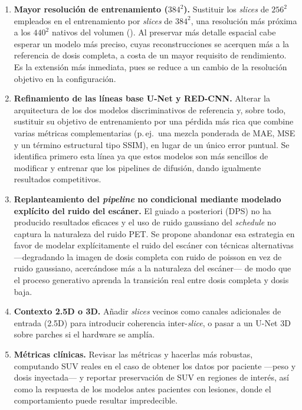 \begin{enumerate}[leftmargin=*]
    \item \textbf{Mayor resolución de entrenamiento ($384^2$).}
    Sustituir los \textit{slices} de $256^2$ empleados en el
    entrenamiento por \textit{slices} de $384^2$, una resolución
    más próxima a los $440^2$ nativos del volumen
    (). Al preservar más detalle
    espacial cabe esperar un modelo más preciso, cuyas
    reconstrucciones se acerquen más a la referencia de dosis
    completa, a costa de un mayor requisito de rendimiento. 
    Es la extensión más inmediata, pues se reduce a un cambio de 
    la resolución objetivo en la configuración.

    \item \textbf{Refinamiento de las líneas base U-Net y RED-CNN.}
    Alterar la arquitectura de los dos modelos discriminativos de
    referencia y, sobre todo, sustituir su objetivo de
    entrenamiento por una pérdida más rica que combine varias
    métricas complementarias (p.\,ej.\ una mezcla ponderada de MAE,
    MSE y un término estructural tipo SSIM), en lugar de un único
    error puntual. Se identifica primero esta línea ya que estos
    modelos son más sencillos de modificar y entrenar que los pipelines de 
    difusión, dando igualmente resultados competitivos.

    \item \textbf{Replanteamiento del \textit{pipeline} no
    condicional mediante modelado explícito del ruido del
    escáner.} El guiado a posteriori (DPS) no ha producido
    resultados eficaces y el uso de ruido gaussiano del
    \textit{schedule} no captura la naturaleza del ruido PET. Se
    propone abandonar esa estrategia en favor de modelar
    explícitamente el ruido del escáner con técnicas alternativas
    ---degradando la imagen de dosis completa con ruido de poisson en vez de
    ruido gaussiano, acercándose más a la naturaleza del escáner--- de modo que el
    proceso generativo aprenda la transición real entre dosis
    completa y dosis baja.

    \item \textbf{Contexto 2.5D o 3D.} Añadir \textit{slices}
    vecinos como canales adicionales de entrada (2.5D) para
    introducir coherencia inter-\textit{slice}, o pasar a un
    U-Net 3D sobre parches si el hardware se amplía.

    \item \textbf{Métricas clínicas.} Revisar las métricas y hacerlas más robustas,
    computando SUV reales en el caso de obtener los datos por paciente ---peso y dosis inyectada--- 
    y reportar preservación de SUV en regiones de interés, así como la respuesta de los modelos antes
    pacientes con lesiones, donde el comportamiento puede resultar impredecible.
\end{enumerate}

